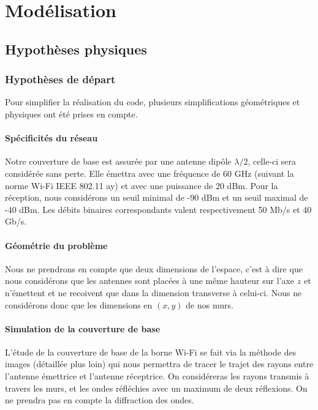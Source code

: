 \chapter{Modélisation}
\label{chapter-1}
\section{Hypothèses physiques}

\subsection{Hypoth{\`e}ses de d{\'e}part}

Pour simplifier la r{\'e}alisation du code, plusieurs simplifications
g{\'e}om{\'e}triques et physiques ont {\'e}t{\'e} prises en compte.

\subsubsection{Sp{\'e}cificit{\'e}s du r{\'e}seau}

Notre couverture de base est assur{\'e}e par une antenne dip{\^o}le $\lambda /
2$, celle-ci sera consid{\'e}r{\'e}e sans perte. Elle {\'e}mettra avec une
fr{\'e}quence de 60 GHz (suivant la norme Wi-Fi IEEE 802.11 ay) et avec une
puissance de 20 dBm. Pour la r{\'e}ception, nous consid{\'e}rons un seuil
minimal de -90 dBm et un seuil maximal de -40 dBm. Les d{\'e}bits binaires
correspondants valent respectivement 50 Mb/s et 40 Gb/s.

\subsubsection{G{\'e}om{\'e}trie du probl{\`e}me}

Nous ne prendrons en compte que deux dimensions de l'espace, c'est {\`a} dire
que nous consid{\'e}rons que les antennes sont plac{\'e}es {\`a} une m{\^e}me
hauteur sur l'axe $z$ et n'{\'e}mettent et ne recoivent que dans la dimension
transverse {\`a} celui-ci. Nous ne consid{\'e}rons donc
que les dimensions en $(x, y)$ de nos murs.

\subsubsection{Simulation de la couverture de base}

L'{\'e}tude de la couverture de base de la borne Wi-Fi se fait via la
m{\'e}thode des images (d{\'e}taill{\'e}e plus loin) qui nous permettra de
tracer le trajet des rayons entre l'antenne {\'e}mettrice et l'antenne
r{\'e}ceptrice. On consid{\'e}reras les rayons transmis {\`a} travers les
murs, et les ondes r{\'e}fl{\'e}chies avec un maximum de deux r{\'e}flexions.
On ne prendra pas en compte la diffraction des ondes.

